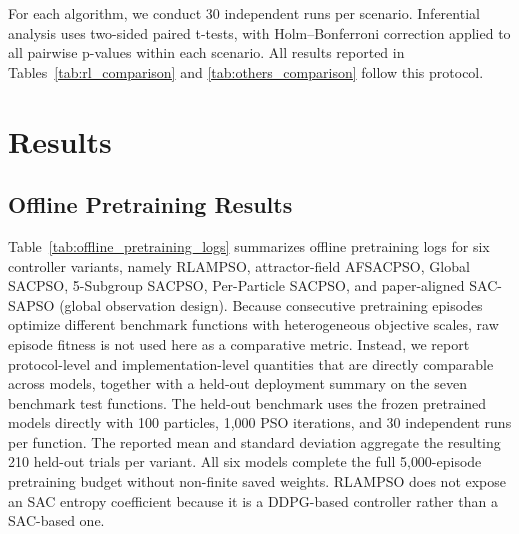 \documentclass[final,5p,times]{elsarticle}
\begin{document}
For each algorithm, we conduct 30 independent runs per scenario.
Inferential analysis uses two-sided paired t-tests, with Holm--Bonferroni correction applied to all pairwise p-values within each scenario.
All results reported in Tables~\ref{tab:rl_comparison} and \ref{tab:others_comparison} follow this protocol.

\section{Results}
\label{sec:results}

\subsection{Offline Pretraining Results}
Table~\ref{tab:offline_pretraining_logs} summarizes offline pretraining logs for six controller variants, namely RLAMPSO, attractor-field AFSACPSO, Global SACPSO, 5-Subgroup SACPSO, Per-Particle SACPSO, and paper-aligned SAC-SAPSO (global observation design).
Because consecutive pretraining episodes optimize different benchmark functions with heterogeneous objective scales, raw episode fitness is not used here as a comparative metric.
Instead, we report protocol-level and implementation-level quantities that are directly comparable across models, together with a held-out deployment summary on the seven benchmark test functions.
The held-out benchmark uses the frozen pretrained models directly with 100 particles, 1{,}000 PSO iterations, and 30 independent runs per function. The reported mean and standard deviation aggregate the resulting 210 held-out trials per variant.
All six models complete the full 5{,}000-episode pretraining budget without non-finite saved weights. RLAMPSO does not expose an SAC entropy coefficient because it is a DDPG-based controller rather than a SAC-based one.
\end{document}
